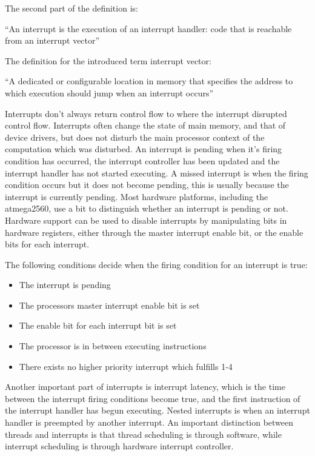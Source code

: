 The second part of the definition is:


{\addtolength{\leftskip}{10 mm}
	\enquote{An interrupt is the execution of an interrupt handler: code that is reachable from an interrupt vector}
	
}


The definition for the introduced term interrupt vector:


{\addtolength{\leftskip}{10 mm}
	\enquote{A dedicated or configurable location in memory that specifies the address to which execution should jump when an interrupt occurs}
	
}


Interrupts don’t always return control flow to where the interrupt disrupted control flow. Interrupts often change the state of main memory, and that of device drivers, but does not disturb the main processor context of the computation which was disturbed. \newline
An interrupt is pending when it's firing condition has occurred, the interrupt controller has been updated and the interrupt handler has not started executing. A missed interrupt is when the firing condition occurs but it does not become pending, this is usually because the interrupt is currently pending. Most hardware platforms, including the atmega2560, use a bit to distinguish whether an interrupt is pending or not. Hardware support can be used to disable interrupts by manipulating bits in hardware registers, either through the master interrupt enable bit, or the enable bits for each interrupt. 


The following conditions decide when the firing condition for an interrupt is true:


\begin{itemize}
	\item The interrupt is pending
	\item The processors master interrupt enable bit is set
	\item The enable bit for each interrupt bit is set
	\item The processor is in between executing instructions 
	\item There exists no higher priority interrupt which fulfills 1-4
\end{itemize}


Another important part of interrupts is interrupt latency, which is the time between the interrupt firing conditions become true, and the first instruction of the interrupt handler has begun executing. Nested interrupts is when an interrupt handler is preempted by another interrupt. An important distinction between threads and interrupts is that thread scheduling is through software, while interrupt scheduling is through hardware interrupt controller.


